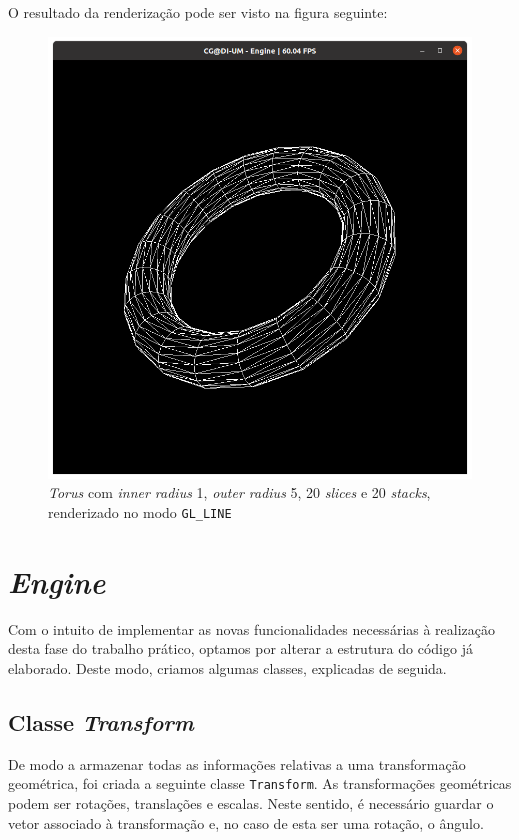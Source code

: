 \documentclass[a4paper, 11pt]{article}
\begin{document}
\

\

O resultado da renderização pode ser visto na figura seguinte:

\begin{figure}[H]
    \centering
    \includegraphics[width=.7\textwidth]{img/torus_3.png}
    \caption{\textit{Torus} com \textit{inner radius} 1, \textit{outer radius} 5,
    20 \textit{slices} e 20 \textit{stacks}, renderizado no modo \texttt{GL\_LINE}}
\end{figure}

\pagebreak

\section{\textit{Engine}}
\label{sec:engine}

Com o intuito de implementar as novas funcionalidades necessárias à realização
desta fase do trabalho prático, optamos por alterar a estrutura do código já elaborado.
Deste modo, criamos algumas classes, explicadas de seguida.

\subsection{Classe \textit{Transform}}

De modo a armazenar todas as informações relativas a uma transformação geométrica,
foi criada a seguinte classe \texttt{Transform}. As transformações geométricas podem
ser rotações, translações e escalas. Neste sentido, é necessário guardar o vetor
associado à transformação e, no caso de esta ser uma rotação, o ângulo.
\end{document}
